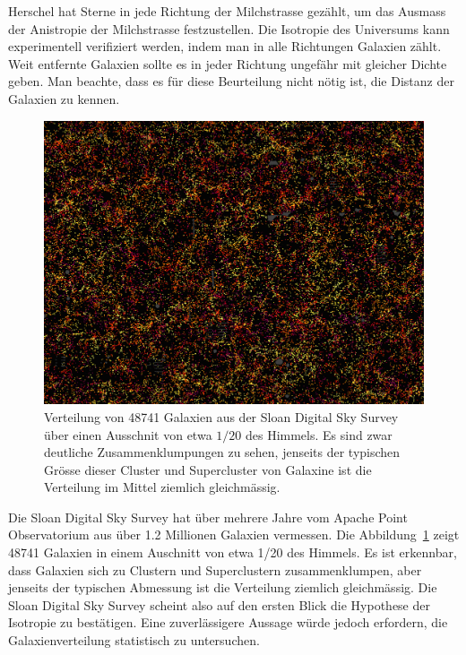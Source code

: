 Herschel hat Sterne in jede Richtung der Milchstrasse gezählt, um
das Ausmass der Anistropie der Milchstrasse festzustellen.
Die Isotropie des Universums kann experimentell verifiziert werden,
indem man in alle Richtungen Galaxien zählt.
Weit entfernte Galaxien sollte es in jeder Richtung ungefähr mit 
gleicher Dichte geben.
Man beachte, dass es für diese Beurteilung nicht nötig ist, die
Distanz der Galaxien zu kennen.

\begin{figure}
\centering
\includegraphics[width=\hsize]{chapters/images/cmass.png}
\caption{Verteilung von 48741 Galaxien aus der Sloan Digital
Sky Survey \cite{skript:cmass} über einen Ausschnit von etwa
$1/20$ des Himmels.
Es sind zwar deutliche Zusammenklumpungen zu sehen, jenseits der
typischen Grösse dieser Cluster und Supercluster von Galaxine
ist die Verteilung im Mittel ziemlich gleichmässig.
\label{skript:robertson:cmass}}
\end{figure}

Die Sloan Digital Sky Survey \cite{skript:sdss} hat über mehrere
Jahre vom Apache Point Observatorium aus über 1.2 Millionen Galaxien
vermessen.
Die Abbildung~\ref{skript:robertson:cmass} zeigt 48741 Galaxien in
einem Auschnitt von etwa 1/20 des Himmels.
Es ist erkennbar, dass Galaxien sich zu Clustern und Superclustern
zusammenklumpen, aber jenseits der typischen Abmessung ist die
Verteilung ziemlich gleichmässig.
Die Sloan Digital Sky Survey scheint also auf den ersten Blick
die Hypothese der Isotropie zu bestätigen.
Eine zuverlässigere Aussage würde jedoch erfordern, die Galaxienverteilung
statistisch zu untersuchen.

